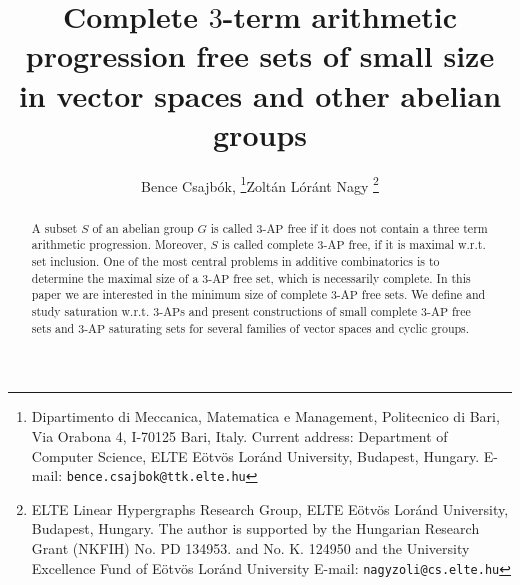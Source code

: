 \documentclass[11pt]{article}
\title{Complete $3$-term arithmetic progression free sets of small size in vector spaces and other abelian groups}
\author{Bence Csajb\'ok, \footnote{Dipartimento di Meccanica, Matematica e Management, Politecnico di Bari, Via Orabona 4, I-70125 Bari, Italy. Current address: Department of Computer Science, ELTE Eötvös Loránd University, Budapest, Hungary. E-mail: {\tt bence.csajbok@ttk.elte.hu}}\quad Zolt\'an L\'or\'ant Nagy \footnote{ELTE Linear Hypergraphs  Research Group, ELTE Eötvös Loránd University, Budapest, Hungary. The author is supported by the Hungarian Research Grant (NKFIH) No. PD  134953. and No. K. 124950 and the University Excellence Fund of Eötvös Loránd University E-mail: {\tt nagyzoli@cs.elte.hu}}}
\date{}
\numberwithin{table}{section}
\newcommand{\F}{{\mathbb F}}
\theoremstyle{definition}
\begin{document}
	\maketitle
	
	\begin{abstract}
		
		
		A subset $S$ of an abelian group $G$ is called $3$-$\mathrm{AP}$ free if it does not contain a three term arithmetic progression. Moreover, $S$ is called complete $3$-$\mathrm{AP}$ free, if it is maximal w.r.t. set inclusion.
		One of the most central problems in additive combinatorics is to determine the maximal size of a $3$-$\mathrm{AP}$ free set, which is necessarily complete. 
		In this paper we are interested in the minimum size of complete $3$-$\mathrm{AP}$ free sets. We define and study saturation w.r.t. $3$-$\mathrm{AP}$s and present constructions of small complete $3$-$\mathrm{AP}$ free sets 
		and $3$-$\mathrm{AP}$ saturating sets 
		for several families of vector spaces and cyclic groups.
		
	\end{abstract}
\end{document}
